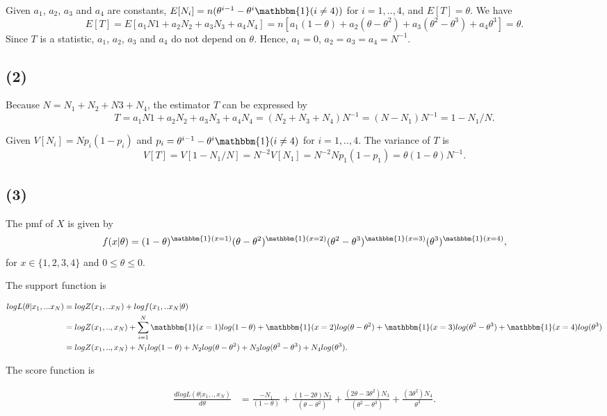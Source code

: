 \documentclass[
]{article}
\begin{document}
Given \(a_1\), \(a_2\), \(a_3\) and \(a_4\) are constants,
\(E[N_i] = n(\theta^{i-1}-\theta^{i}\mathbbm{1}(i \neq 4))\) for
\(i = 1,..,4\), and \(E[T] = \theta\). We have
\[E[T] = E[a_1N1+a_2N_2+a_3N_3+a_4N_4] =n[a_1(1-\theta)+a_2(\theta-\theta^2)+a_3(\theta^2-\theta^3)+a_4\theta^3] =\theta.\]
Since \(T\) is a statistic, \(a_1\), \(a_2\), \(a_3\) and \(a_4\) do not
depend on \(\theta\). Hence, \(a_1 = 0\), \(a_2 = a_3 = a_4 = N^{-1}\).

\hypertarget{section-1}{%
\subsection{(2)}\label{section-1}}

Because \(N = N_1 + N_2 + N3 + N_4\), the estimator \(T\) can be
expressed by
\[T = a_1N1+a_2N_2+a_3N_3+a_4N_4 = (N_2+N_3+N_4)N^{-1} = (N-N_1)N^{-1}=1-N_1/N.\]

Given \(V[N_i] = Np_i(1-p_i)\) and
\(p_i = \theta^{i-1}-\theta^{i}\mathbbm{1}(i \neq 4)\) for
\(i = 1,..,4\). The variance of \(T\) is
\[V[T] = V[1-N_1/N] = N^{-2}V[N_1] = N^{-2}Np_1(1-p_1) = \theta(1-\theta)N^{-1}.\]

\hypertarget{section-2}{%
\subsection{(3)}\label{section-2}}

The pmf of \(X\) is given by
\[f(x|\theta) = (1-\theta)^{\mathbbm{1}(x = 1)}(\theta-\theta^2)^{\mathbbm{1}(x = 2)}(\theta^2-\theta^3)^{\mathbbm{1}(x = 3)}(\theta^3)^{\mathbbm{1}(x = 4)},\]
for \(x \in \{1,2,3,4\}\) and \(0\leq\theta\leq0\).

The support function is

\begin{align*}
logL(\theta|x_1,...x_N) &= logZ(x_1,..x_N)+logf(x_1,..x_N|\theta) \\
&= logZ(x_1,..,x_N)+\sum_{i=1}^{N}\mathbbm{1}(x = 1)log(1-\theta)+\mathbbm{1}(x = 2)log(\theta-\theta^2)+\mathbbm{1}(x = 3)log(\theta^2-\theta^3)+\mathbbm{1}(x = 4)log(\theta^3)\\
&= logZ(x_1,..,x_N)+N_1log(1-\theta)+N_2log(\theta-\theta^2)+N_3log(\theta^2-\theta^3)+N_4log(\theta^3).
\end{align*}

The score function is

\begin{align*}
\frac{dlogL(\theta|x_1,.,x_N)}{d\theta} &= \frac{-N_1}{(1-\theta)}+\frac{(1-2\theta)N_2}{(\theta-\theta^2)}+\frac{(2\theta-3\theta^2)N_3}{(\theta^2-\theta^3)}+\frac{(3\theta^2)N_4}{\theta^3}.\\
\end{align*}
\end{document}
